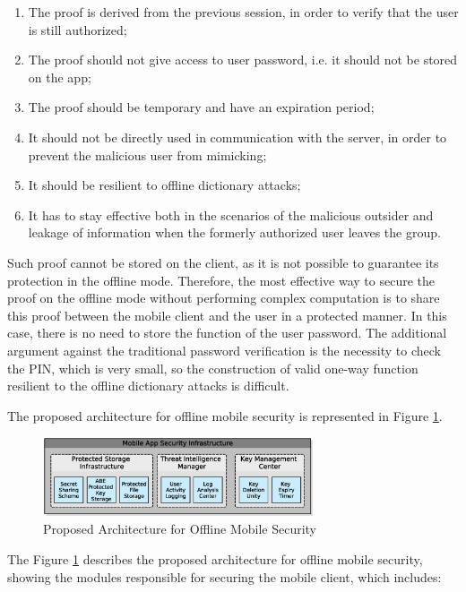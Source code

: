 \documentclass[twocolumn]{svjour3}          	%
\begin{document}
\begin{enumerate}
	\item The proof is derived from the previous session, in order to verify that the user is still authorized;
	\item The proof should not give access to user password, i.e. it should not be stored on the app;
	\item The proof should be temporary and have an expiration period;
	\item It should not be directly used in communication with the server, in order to prevent the malicious user from mimicking;
	\item It should be resilient to offline dictionary attacks;
	\item It has to stay effective both in the scenarios of the malicious outsider and leakage of information when the formerly authorized user leaves the group.
\end{enumerate}

Such proof cannot be stored on the client, as it is not possible to guarantee its protection in the offline mode. Therefore, the most effective way to secure the proof on the offline mode without performing complex computation is to share this proof between the mobile client and the user in a protected manner. In this case, there is no need to store the function of the user password. The additional argument against the traditional password verification is the necessity to check the PIN, which is very small, so the construction of valid one-way function resilient to the offline dictionary attacks is difficult.

The proposed architecture for offline mobile security is represented in Figure \ref{fig:03}.

\begin{figure}[h!]
	\centering
	\includegraphics[width=8cm]{fig03.eps}
	\caption{Proposed Architecture for Offline Mobile Security}
	\label{fig:03}
\end{figure}

The Figure \ref{fig:03} describes the proposed architecture for offline mobile security, showing the modules responsible for securing the mobile client, which includes:
\end{document}
